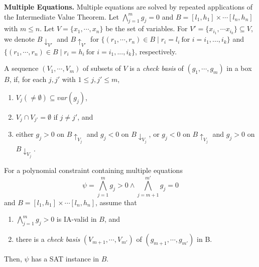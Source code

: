 \documentclass[runningheads,a4paper,oribibl]{llncs}
\newcommand{\suppress}[1]{} %
\begin{document}
\noindent 
\textbf{Multiple Equations.}
Multiple equations are solved by repeated applications of the Intermediate Value Theorem. 
Let $\bigwedge \limits_{j=1}^m g_j = 0$ and $B = {[l_1, h_1] \times \cdots [l_n, h_n]}$
with $m \leq n$. 
Let ${V = \{x_1, \cdots, x_n\}}$ be the set of variables.
For $V' = \{x_{i_1}, \cdots x_{i_k} \} \subseteq V$,
we denote $B\downarrow_{V'}$ and $B\uparrow_{V'}$ for
$\{ (r_1, \cdots, r_n) \in B \mid r_i = l_i~\text{for }i=i_1,...,i_k \}$
and ${\{ (r_1, \cdots, r_n) \in B \mid r_i = h_i~\text{for }i=i_1,...,i_k \}}$, respectively. 

\begin{definition} \label{def:CheckBasis} 
  A sequence $(V_1, \cdots, V_m)$ of subsets of $V$ is a {\em check basis} of
  $(g_1, \cdots, g_m)$ in a box $B$,
  if, for each $j,j'$ with $1 \leq j, j' \leq m$, 
\begin{enumerate}
\item $V_j (\neq \emptyset) \subseteq var(g_j)$, 
\item $V_j \cap V_{j'} = \emptyset$ if $j \neq j'$, and 
\item either $g_j > 0$ on $B\uparrow_{V_j}$ and $g_j < 0$ on $B\downarrow_{V_j}$, or
      $g_j < 0$ on $B\uparrow_{V_j}$ and $g_j > 0$ on $B\downarrow_{V_j}$. 
\end{enumerate}
\end{definition} 
\suppress{
For all $j\in \{1, \cdots, m\}$, let $k_j = |V_j|$ and
${V_j = \{v_{jk} \mid 1 \le k \le k_j \}}$, then, there exist two combinations
${(x_{j1}, \cdots, x_{jk_j}) = (t_{j1}, \cdots, t_{jk_j})}$ and
${(x_{j1}, \cdots, x_{jk_j}) = (t'_{j1}, \cdots, t'_{jk_j})}$
where $t_{jk} \neq t'_{jk} \in (l_{jk}, h_{jk})$, $1 \le k \le k_j$ such that
\[g_j(t_{j1}, \cdots, t_{jk_j}, \cdots, x_{jk}, \cdots) > 0\] and
\[g_j(t'_{j1}, \cdots, t'_{jk_j}, \cdots, x_{jk}, \cdots) < 0\]
for all values of $x_{jk}$ in $(l_{jk}, h_{jk})$ where $x_{jk} \in var(g_j) \setminus V_j$.
We denote $ivt(g_j, V_j, I)$ to represent that the polynomial $g_j$ enjoy this property
with respect to $V_j$ and $I$.
} %

\begin{lemma} \label{lem:multieq}
For a polynomial constraint containing multiple equations \[\psi= 
\bigwedge \limits_{j=1}^m g_j>0 \wedge
\bigwedge \limits_{j=m+1}^{m'} g_j = 0\]
and $B = {[l_1, h_1] \times \cdots [l_n, h_n]}$, 
assume that
\begin{enumerate}
\item $\bigwedge \limits_{j=1}^m g_j>0$ is IA-valid in $B$, and
\item there is a {\em check basis} $(V_{m+1}, \cdots, V_{m'})$ of $(g_{m+1}, \cdots, g_{m'})$
  in B. 
\end{enumerate}
Then, $\psi$ has a SAT instance in $B$.
\end{lemma}
\end{document}
